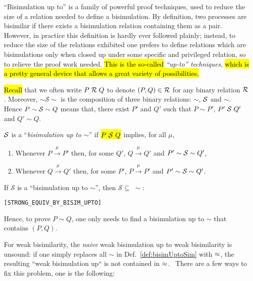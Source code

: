 ``Bisimulation up to'' is a family of  powerful proof techniques,
used to reduce the size of a relation needed to define a bisimulation.
By definition, two processes are bisimilar if there exists a
bisimulation relation containing them as a pair. However, in practice
this definition is hardly ever followed plainly; instead, to reduce
the size of the relations exhibited one prefers to define relations
which are bisimulations only when closed up under some specific and
privileged relation, so to relieve the proof work needed. \hl{This is the so-called}
\emph{``up-to'' techniques}, \hl{which is a pretty general device that
allows a great variety of possibilities.}

\hl{Recall} that we often write $P \;\R\; Q$ to denote
$(P, Q) \in \R$ for any binary relation $\R$. 
Moreover, 
 $\sim \mathcal{S} \sim$ is the composition of three binary
relations: $\sim$, $\S$ and $\sim$. Hence $P \sim \S \sim Q$ means that,
there exist $P'$ and $Q'$ such that $P \sim P'$, $P' \;\S\; Q'$ and $Q' \sim Q$.
\begin{definition}
  \label{def:bisimUptoSim}
$\S$ is a ``\emph{bisimulation up to $\sim$}'' if \hl{$P\ \S\ Q$} implies, for all $\mu$,
\begin{enumerate}
\item Whenever $P \overset{\mu}{\rightarrow} P'$ then, for some
  $Q'$, $Q \overset{\mu}{\rightarrow} Q'$ and $P' \sim \S
  \sim Q'$,
\item Whenever $Q \overset{\mu}{\rightarrow} Q'$ then, for some
  $P'$, $P \overset{\mu}{\rightarrow} P'$ and $P' \sim \S
  \sim Q'$.
\end{enumerate}
\end{definition}

\begin{theorem}
If $\mathcal{S}$ is a ``bisimulation up to $\sim$'', then
$\mathcal{S} \subseteq\;\sim$:
\begin{alltt}
\HOLTokenTurnstile{}   \HOLSymConst{\HOLTokenConj{}}    \HOLSymConst{\HOLTokenImp{}}  \HOLSymConst{\HOLTokenStrongEQ} \hfill{[STRONG_EQUIV_BY_BISIM_UPTO]}
\end{alltt}
\end{theorem}
Hence, to prove $P \sim Q$, one only needs to find a bisimulation
up to $\sim$ that contains $(P, Q)$.

For weak bisimilarity, the \emph{naive} weak bisimulation up to weak bisimilarity
is unsound: if one simply replaces all $\sim$ in
Def.~\ref{def:bisimUptoSim} with $\wb$, the resulting ``weak
bisimulation up`` is not contained in $\wb$.~\cite{sangiorgi1992problem}
There are a few ways to fix this problem, one is the following:

